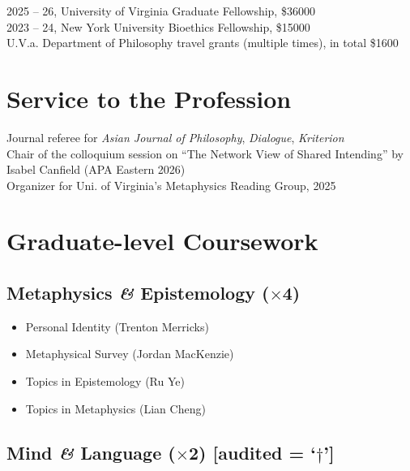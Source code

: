 \documentclass[10pt]{article}
\begin{document}
2025 -- 26, University of Virginia Graduate Fellowship, \$36000\\
2023 -- 24, New York University Bioethics Fellowship, \$15000\\
U.V.a. Department of Philosophy travel grants (multiple times), in total \$1600

\section*{Service to the Profession}

\hangindent=0.8cm Journal referee for \emph{Asian Journal of Philosophy}, \emph{Dialogue}, \emph{Kriterion}\\

\hangindent=0.8cm Chair of the colloquium session on ``The Network View of Shared Intending'' by Isabel Canfield (APA Eastern 2026)\\

\hangindent=0.8cm Organizer for Uni. of Virginia's Metaphysics Reading Group, 2025

\section*{Graduate-level Coursework}

\subsection*{Metaphysics \emph{\&} Epistemology (\begin{math}\times\end{math}4)}

\begin{itemize}
\item Personal Identity (Trenton Merricks)
\item Metaphysical Survey (Jordan MacKenzie)
\item Topics in Epistemology (Ru Ye)
\item Topics in Metaphysics (Lian Cheng)
\end{itemize}

\subsection*{Mind \emph{\&} Language (\begin{math}\times\end{math}2) [audited = `\begin{math}\dagger\end{math}']}
\end{document}
